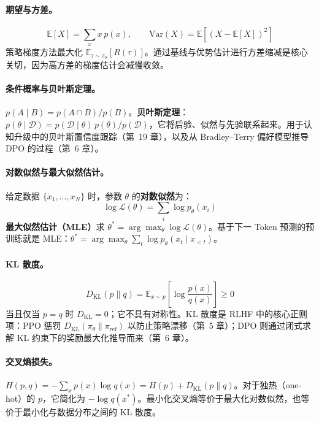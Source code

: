 \paragraph{期望与方差。}
\[
\mathbb{E}[X] = \sum_x x\, p(x), \qquad \mathrm{Var}(X) = \mathbb{E}[(X - \mathbb{E}[X])^2]
\]
策略梯度方法最大化 $\mathbb{E}_{\tau \sim \pi_\theta}[R(\tau)]$。通过基线与优势估计进行方差缩减是核心关切，因为高方差的梯度估计会减慢收敛。

\paragraph{条件概率与贝叶斯定理。}
$p(A \mid B) = p(A \cap B)/p(B)$。\textbf{贝叶斯定理}：$p(\theta \mid \mathcal{D}) = p(\mathcal{D} \mid \theta)\,p(\theta) / p(\mathcal{D})$，它将后验、似然与先验联系起来。用于认知升级中的贝叶斯置信度跟踪（第~19 章），以及从 Bradley--Terry 偏好模型推导 DPO 的过程（第~6 章）。

\paragraph{对数似然与最大似然估计。}
给定数据 $\{x_1,\ldots,x_N\}$ 时，参数 $\theta$ 的\textbf{对数似然}为：
\[
\log \mathcal{L}(\theta) = \sum_i \log p_\theta(x_i)
\]
\textbf{最大似然估计（MLE）}求 $\theta^* = \arg\max_\theta \log\mathcal{L}(\theta)$。基于下一 Token 预测的预训练就是 MLE：$\theta^* = \arg\max_\theta \sum_t \log p_\theta(x_t \mid x_{<t})$。

\paragraph{KL 散度。}
\begin{equation}
D_{\mathrm{KL}}(p \| q) = \mathbb{E}_{x \sim p}\!\left[\log \frac{p(x)}{q(x)}\right] \geq 0
\end{equation}
当且仅当 $p = q$ 时 $D_{\mathrm{KL}} = 0$；它不具有对称性。KL 散度是 RLHF 中的核心正则项：PPO 惩罚 $D_{\mathrm{KL}}(\pi_\theta \| \pi_{\mathrm{ref}})$ 以防止策略漂移（第~5 章）；DPO 则通过闭式求解 KL 约束下的奖励最大化推导而来（第~6 章）。

\paragraph{交叉熵损失。}
$H(p, q) = -\sum_x p(x)\log q(x) = H(p) + D_{\mathrm{KL}}(p\|q)$。对于独热（one-hot）的 $p$，它简化为 $-\log q(x^*)$。最小化交叉熵等价于最大化对数似然，也等价于最小化与数据分布之间的 KL 散度。

